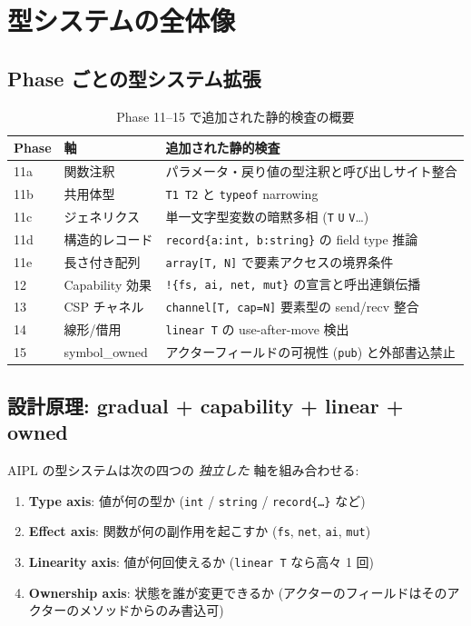 \documentclass[11pt,a4paper]{article}
\newcommand{\code}[1]{\texttt{\small #1}}
\begin{document}
\section{型システムの全体像}
\label{sec:overview}

\subsection{Phase ごとの型システム拡張}

\begin{table}[htbp]
\centering
\small
\begin{tabularx}{\linewidth}{l l X}
\toprule
\textbf{Phase} & \textbf{軸} & \textbf{追加された静的検査} \\
\midrule
11a & 関数注釈 & パラメータ・戻り値の型注釈と呼び出しサイト整合 \\
11b & 共用体型 & \code{T1 \textbar{} T2} と \code{typeof} narrowing \\
11c & ジェネリクス & 単一文字型変数の暗黙多相 (\code{T} \code{U} \code{V}\dots) \\
11d & 構造的レコード & \code{record\{a:int, b:string\}} の field type 推論 \\
11e & 長さ付き配列 & \code{array[T, N]} で要素アクセスの境界条件 \\
12  & Capability 効果 & \code{!\{fs, ai, net, mut\}} の宣言と呼出連鎖伝播 \\
13  & CSP チャネル & \code{channel[T, cap=N]} 要素型の send/recv 整合 \\
14  & 線形/借用 & \code{linear T} の use-after-move 検出 \\
15  & symbol\_owned & アクターフィールドの可視性 (\code{pub}) と外部書込禁止 \\
\bottomrule
\end{tabularx}
\caption{Phase 11--15 で追加された静的検査の概要}
\end{table}

\subsection{設計原理: gradual + capability + linear + owned}

AIPL の型システムは次の四つの \emph{独立した} 軸を組み合わせる:

\begin{enumerate}
  \item \textbf{Type axis}: 値が何の型か (\code{int} / \code{string} / \code{record\{\dots\}} など)
  \item \textbf{Effect axis}: 関数が何の副作用を起こすか
        (\code{fs}, \code{net}, \code{ai}, \code{mut})
  \item \textbf{Linearity axis}: 値が何回使えるか
        (\code{linear T} なら高々 1 回)
  \item \textbf{Ownership axis}: 状態を誰が変更できるか
        (アクターのフィールドはそのアクターのメソッドからのみ書込可)
\end{enumerate}
\end{document}

